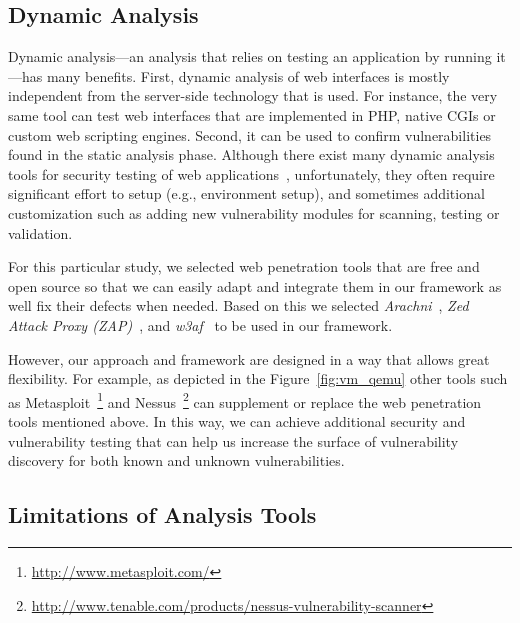 \documentclass[conference]{./templates/ndss/IEEEtran}
\newcounter{t0d0_counter}
\newcounter{pr00f_counter}
\begin{document}
\subsection{Dynamic Analysis}
\label{sec:dynamic-analysis}



Dynamic analysis---an analysis that relies on testing an application by
running it---has many benefits.  First, dynamic analysis of web
interfaces is mostly independent from the server-side technology that is used.
For instance, the very same tool can test web interfaces that are implemented in PHP, native CGIs
or custom web scripting engines.  
Second, it can be used to
confirm vulnerabilities found in the static analysis phase.
Although there exist many dynamic analysis tools for security testing 
of web applications~\cite{elie-sp2010-AutoBlackBoxWebTest}, 
unfortunately, they often require significant effort to setup (e.g., environment 
setup), and sometimes additional customization such as adding new 
vulnerability modules for scanning, testing or validation. 



For this particular study, we selected web penetration tools that are free and open source so that we
can easily adapt and integrate them in our framework as well fix their defects when
needed.  Based on this we selected \emph{Arachni}~\cite{foot-arachni},
\emph{Zed Attack Proxy (ZAP)}~\cite{foot-zap}, and \emph{w3af}~\cite{foot-w3af}
to be used in our framework.

However, our approach and framework are designed in a way that allows 
great flexibility. For example, as depicted in the Figure~\ref{fig:vm_qemu} 
other tools such as Metasploit~\footnote{\url{http://www.metasploit.com/}} 
and Nessus~\footnote{\url{http://www.tenable.com/products/nessus-vulnerability-scanner}} 
can supplement or replace the web penetration tools mentioned above. 
In this way, we can achieve additional security and vulnerability testing 
that can help us increase the surface of vulnerability discovery for both 
known and unknown vulnerabilities. 














\subsection{Limitations of Analysis Tools}
\label{sec:discuss-limitationsdyntools}
\end{document}
